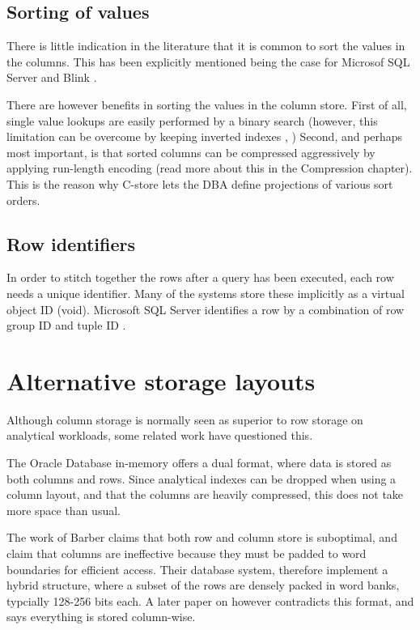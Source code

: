 \subsection{Sorting of values}
\label{sub:Sorting of values}
There is little indication in the literature that it is common to sort the values in the columns. This has been explicitly mentioned being the case for Microsof SQL Server \cite{Larson2013-mc} and Blink \cite{Raman2013-em}.

There are however benefits in sorting the values in the column store. First of all, single value lookups are easily performed by a binary search (however, this limitation can be overcome by keeping inverted indexes \cite{Lemke2010-is}, \cite{Schwalb2014-hn}) Second, and perhaps most important, is that sorted columns can be compressed aggressively by applying run-length encoding (read more about this in the Compression chapter). This is the reason why C-store \cite{Stonebraker2005-qz} lets the DBA define projections of various sort orders.

\subsection{Row identifiers}
\label{sub:Row identifiers}
In order to stitch together the rows after a query has been executed, each row needs a unique identifier. Many of the systems store these implicitly \cite{Boncz2002-yj, Raman2013-em, Stonebrake2005-qz, Lamb2012-kg} as a virtual object ID (void). Microsoft SQL Server identifies a row by a combination of row group ID and tuple ID \cite{Larson2013-mc}.

\section{Alternative storage layouts}
\label{sec:Alternative storage layouts}
Although column storage is normally seen as superior to row storage on analytical workloads, some related work have questioned this.

The Oracle Database in-memory \cite{Lahiri2015-mz} offers a dual format, where data is stored as both columns and rows. Since analytical indexes can be dropped when using a column layout, and that the columns are heavily compressed, this does not take more space than usual. 

The work of Barber \ea \cite{Barber2012-xt} claims that both row and column store is suboptimal, and claim that columns are ineffective because they must be padded to word boundaries for efficient access. Their database system,  therefore implement a hybrid structure, where a subset of the rows are densely packed in word banks, typcially 128-256 bits each. A later paper on  \cite{Raman2013-em} however contradicts this format, and says everything is stored column-wise.

